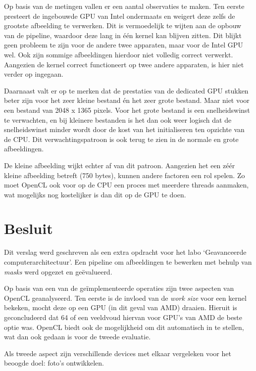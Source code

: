 \documentclass[twocolumn, a4paper]{article}
\begin{document}
Op basis van de metingen vallen er een aantal observaties te maken. Ten eerste presteert de ingebouwde GPU van Intel ondermaats en weigert deze zelfs de grootste afbeelding te verwerken. Dit is vermoedelijk te wijten aan de opbouw van de pipeline, waardoor deze lang in één kernel kan blijven zitten. Dit blijkt geen probleem te zijn voor de andere twee apparaten, maar voor de Intel GPU wel. Ook zijn sommige afbeeldingen hierdoor niet volledig correct verwerkt. Aangezien de kernel correct functioneert op twee andere apparaten, is hier niet verder op ingegaan.

Daarnaast valt er op te merken dat de prestaties van de dedicated GPU stukken beter zijn voor het zeer kleine bestand én het zeer grote bestand. Maar niet voor een bestand van 2048 x 1365 pixels. Voor het grote bestand is een snelheidswinst te verwachten, en bij kleinere bestanden is het dan ook weer logisch dat de snelheidswinst minder wordt door de kost van het initialiseren ten opzichte van de CPU. Dit verwachtingspatroon is ook terug te zien in de normale en grote afbeeldingen. 

De kleine afbeelding wijkt echter af van dit patroon. Aangezien het een zéér kleine afbeelding betreft (750 bytes), kunnen andere factoren een rol spelen. Zo moet OpenCL ook voor op de CPU een proces met meerdere threads aanmaken, wat mogelijks nog kostelijker is dan dit op de GPU te doen. 


\section{Besluit}
Dit verslag werd geschreven als een extra opdracht voor het labo `Geavanceerde computerarchitectuur'. Een pipeline om afbeeldingen te bewerken met behulp van \textit{masks} werd opgezet en ge\"evalueerd.

Op basis van een van de geïmplementeerde operaties zijn twee aspecten van OpenCL geanalyseerd. Ten eerste is de invloed van de \emph{work size} voor een kernel bekeken, mocht deze op een GPU (in dit geval van AMD) draaien. Hieruit is geconcludeerd dat 64 of een veeldvoud hiervan voor GPU's van AMD de beste optie was. OpenCL biedt ook de mogelijkheid om dit automatisch in te stellen, wat dan ook gedaan is voor de tweede evaluatie.

Als tweede aspect zijn verschillende devices met elkaar vergeleken voor het beoogde doel: foto's ontwikkelen. 
\end{document}
